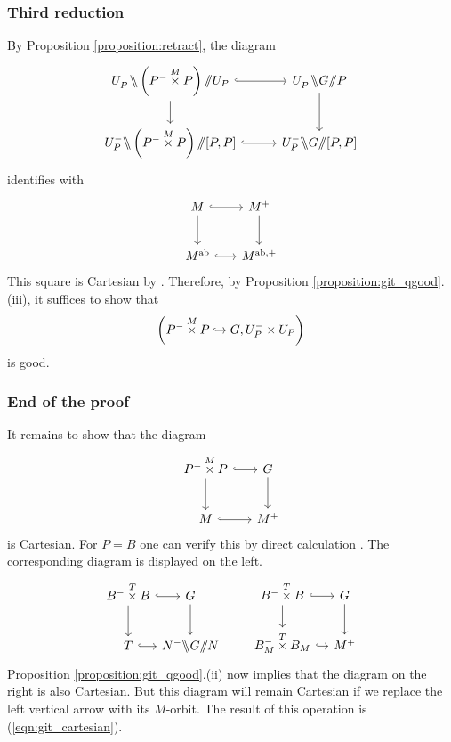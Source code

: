 \subsubsection{Third reduction} By Proposition \ref{proposition:retract}, the diagram
\[
\begin{tikzcd}[
  column sep={12em,between origins},
  row sep={5em,between origins}
]
  U_P^- \bss \left( P^- \overset{M}{\times} P \right) \git U_P \arrow[r, hook] \arrow[d] & U_P^- \bss G \git P \arrow[d] \\
  U_P^- \bss \left( P^- \overset{M}{\times} P \right) \git [P,P] \arrow[r, hook] & U_P^- \bss G \git [P,P]
\end{tikzcd}
\]
identifies with
\[
\begin{tikzcd}[
  column sep={5em,between origins},
  row sep={4em,between origins}
]
  M \arrow[r, hook] \arrow[d] & M^+ \arrow[d] \\
  M^\ab \arrow[r, hook] & M^{\ab, +}
\end{tikzcd}
\]
This square is Cartesian by \cite[Appendix C.4.3]{lin_nearby_cycles}. Therefore, by Proposition \ref{proposition:git_qgood}.(iii), it suffices to show that
  \[\left(P^- \overset{M}{\times} P \hookrightarrow G, U_P^- \times U_P\right)\]
is good. 

\subsubsection{End of the proof} It remains to show that the diagram
\begin{equation}
\label{eqn:git_cartesian}
\begin{tikzcd}[
  column sep={5em,between origins},
  row sep={4em,between origins}
]
  P^- \overset{M}{\times} P \arrow[r, hook] \arrow[d] & G \arrow[d] \\
  M \arrow[r, hook] & M^+ 
\end{tikzcd}
\end{equation}
is Cartesian. For $P = B$ one can verify this by direct calculation \cite[\emph{Proof} of Lemma 3.2.10]{wang_monoid}. The corresponding diagram is displayed on the left.
\[
\begin{tikzcd}[
  column sep={5em,between origins},
  row sep={4em,between origins}
]
  B^- \overset{T}{\times} B \arrow[r, hook] \arrow[d] & G \arrow[d] \\
  T \arrow[r, hook] & N^- \bss G \git N 
\end{tikzcd}
\qquad
\begin{tikzcd}[
  column sep={5em,between origins},
  row sep={4em,between origins}
]
  B^- \overset{T}{\times} B \arrow[r, hook] \arrow[d] & G \arrow[d] \\
  B_M^- \overset{T}{\times} B_M \arrow[r, hook] & M^+ 
\end{tikzcd}
\]
Proposition \ref{proposition:git_qgood}.(ii) now implies that the diagram on the right is also Cartesian. But this diagram will remain Cartesian if we replace the left vertical arrow with its $M$-orbit. The result of this operation is (\ref{eqn:git_cartesian}).

